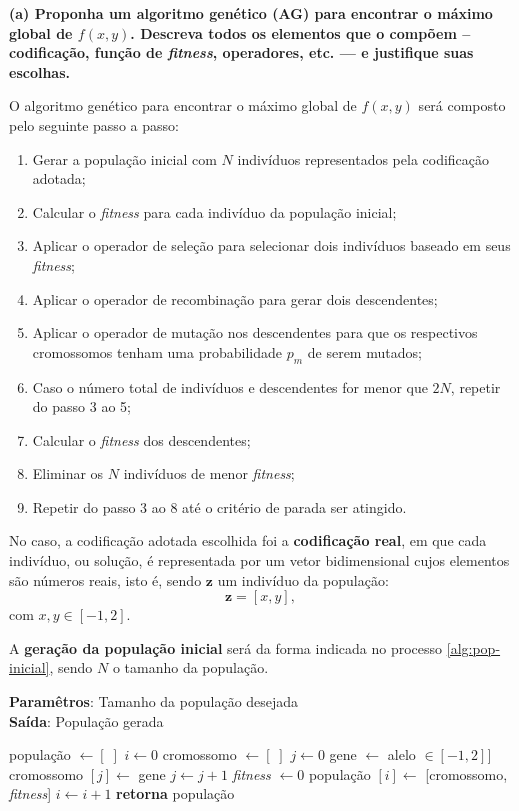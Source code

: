 \documentclass[a4paper, 12pt]{article}
\newcommand{\fitness}{\textit{fitness}\xspace}
\renewcommand{\Return}{\textbf{retorna}\xspace}
\newenvironment{brprocess}[1][]
  {\begin{algorithm}[#1]
     \selectlanguage{brazilian}%
     \floatname{algorithm}{Processo}%
     \renewcommand{\algorithmicif}{\textbf{se}}%
     \renewcommand{\algorithmicfor}{\textbf{para}}%
     \renewcommand{\algorithmicdo}{\textbf{faça}}%
     \renewcommand{\algorithmicthen}{\textbf{faça}}%
     \renewcommand{\algorithmicend}{\textbf{fim}}%
     \renewcommand{\algorithmicwhile}{\textbf{enquanto}}%
     \renewcommand{\algorithmicelse}{\textbf{caso contrário}}%
  }
  {\end{algorithm}}
\begin{document}
\textbf{(a) Proponha um algoritmo genético (AG) para encontrar o máximo global de $f(x, y)$. Descreva todos os elementos que o compõem – codificação, função de \fitness, operadores, etc. — e justifique suas escolhas.}

O algoritmo genético para encontrar o máximo global de $f(x, y)$ será composto pelo seguinte passo a passo:
\begin{enumerate}
    \item Gerar a população inicial com $N$ indivíduos representados pela codificação adotada;
    \item Calcular o \fitness para cada indivíduo da população inicial;
    \item Aplicar o operador de seleção para selecionar dois indivíduos baseado em seus \textit{fitness};
    \item Aplicar o operador de recombinação para gerar dois descendentes;
    \item Aplicar o operador de mutação nos descendentes para que os respectivos cromossomos tenham uma probabilidade $p_m$ de serem mutados;
    \item Caso o número total de indivíduos e descendentes for menor que $2N$, repetir do passo 3 ao 5;
    \item Calcular o \fitness dos descendentes;
    \item Eliminar os $N$ indivíduos de menor \fitness;
    \item Repetir do passo 3 ao 8 até o critério de parada ser atingido.
\end{enumerate}

No caso, a codificação adotada escolhida foi a \textbf{codificação real}, em que cada indivíduo, ou solução, é representada por um vetor bidimensional cujos elementos são números reais, isto é, sendo $\bm{z}$ um indivíduo da população:
\begin{equation}
    \bm{z} = \left[x, y \right],
\end{equation}
com $x,y \in [-1, 2]$.

A \textbf{geração da população inicial} será da forma indicada no processo \ref{alg:pop-inicial}, sendo $N$ o tamanho da população.
\begin{brprocess}[!ht]
    \textbf{Paramêtros}: Tamanho da população desejada\\
    \textbf{Saída}: População gerada
    \cprotect\caption{Geração aleatória da população inicial (\verb|gerar_pop(N)|)}
    \begin{algorithmic}
    \State população $\gets [\;]$
    \State $i\gets 0$
        \State cromossomo $\gets [\;]$
        \State $j \gets 0$
            \State gene $\gets$ alelo $\in [-1, 2]]$
            \State cromossomo $[j] \gets$ gene
            \State $j \gets j + 1$
        \EndWhile
        \State \textit{fitness} $\gets 0$
        \State população $[i] \gets$ [cromossomo, \textit{fitness}]
        \State $i \gets i + 1$
    \EndWhile
    \State \Return população
    \end{algorithmic}
    \label{alg:pop-inicial}
\end{brprocess}
\end{document}
